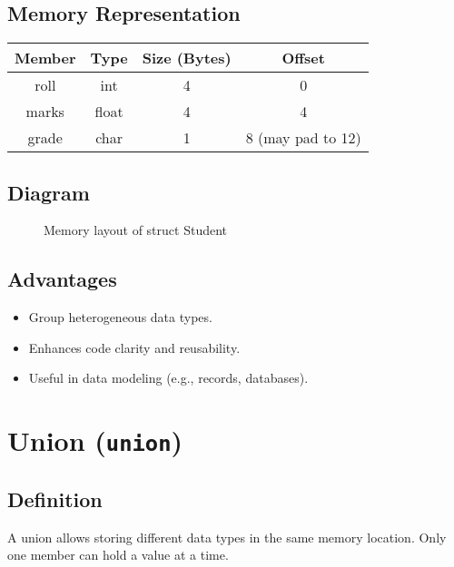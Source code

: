 \subsection*{Memory Representation}
\begin{center}
\begin{tabular}{|c|c|c|c|}
\hline
Member & Type & Size (Bytes) & Offset \\
\hline
roll & int & 4 & 0 \\
marks & float & 4 & 4 \\
grade & char & 1 & 8 (may pad to 12) \\
\hline
\end{tabular}
\end{center}

\subsection*{Diagram}
\begin{figure}[H]
\centering
{}
\caption{Memory layout of struct Student}
\end{figure}

\subsection*{Advantages}
\begin{itemize}
  \item Group heterogeneous data types.
  \item Enhances code clarity and reusability.
  \item Useful in data modeling (e.g., records, databases).
\end{itemize}

\section{Union (\texttt{union})}

\subsection*{Definition}
A union allows storing different data types in the same memory location. Only one member can hold a value at a time.

